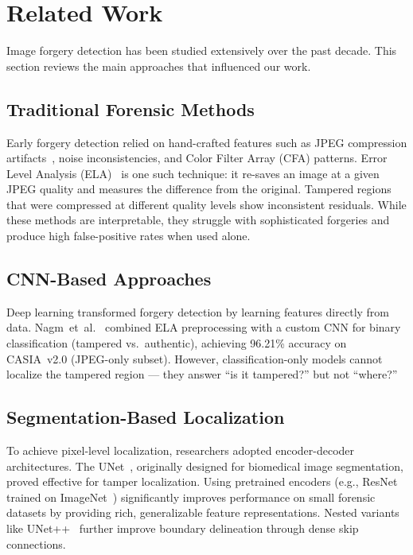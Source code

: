 \documentclass[conference]{IEEEtran}
\begin{document}
\section{Related Work}

Image forgery detection has been studied extensively over the past decade. This section reviews the main approaches that influenced our work.

\subsection{Traditional Forensic Methods}

Early forgery detection relied on hand-crafted features such as JPEG compression artifacts~\cite{bianchi2012jpeg}, noise inconsistencies, and Color Filter Array (CFA) patterns. Error Level Analysis (ELA)~\cite{krawetz2007picture} is one such technique: it re-saves an image at a given JPEG quality and measures the difference from the original. Tampered regions that were compressed at different quality levels show inconsistent residuals. While these methods are interpretable, they struggle with sophisticated forgeries and produce high false-positive rates when used alone.

\subsection{CNN-Based Approaches}

Deep learning transformed forgery detection by learning features directly from data. Nagm~et~al.~\cite{nagm2024etasr} combined ELA preprocessing with a custom CNN for binary classification (tampered vs.\ authentic), achieving 96.21\% accuracy on CASIA~v2.0 (JPEG-only subset). However, classification-only models cannot localize the tampered region --- they answer ``is it tampered?'' but not ``where?''

\subsection{Segmentation-Based Localization}

To achieve pixel-level localization, researchers adopted encoder-decoder architectures. The UNet~\cite{ronneberger2015unet}, originally designed for biomedical image segmentation, proved effective for tamper localization. Using pretrained encoders (e.g., ResNet~\cite{he2016resnet} trained on ImageNet~\cite{deng2009imagenet}) significantly improves performance on small forensic datasets by providing rich, generalizable feature representations. Nested variants like UNet++~\cite{zhou2018unetplusplus} further improve boundary delineation through dense skip connections.
\end{document}

